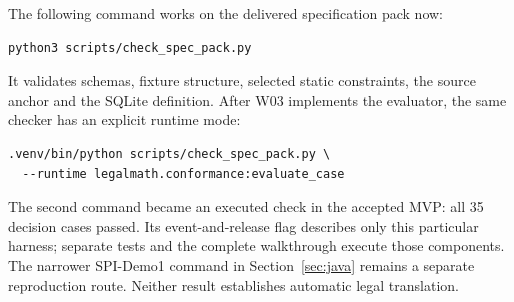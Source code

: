 The following command works on the delivered specification pack now:
\begin{lstlisting}
python3 scripts/check_spec_pack.py
\end{lstlisting}
It validates schemas, fixture structure, selected static constraints, the source
anchor and the SQLite definition. After W03 implements the evaluator, the same
checker has an explicit runtime mode:
\begin{lstlisting}
.venv/bin/python scripts/check_spec_pack.py \
  --runtime legalmath.conformance:evaluate_case
\end{lstlisting}
The second command became an executed check in the accepted MVP: all 35
decision cases passed. Its event-and-release flag describes only this particular
harness; separate tests and the complete walkthrough execute those components.
The narrower SPI-Demo1 command in Section~\ref{sec:java} remains a separate
reproduction route. Neither result establishes automatic legal translation.

